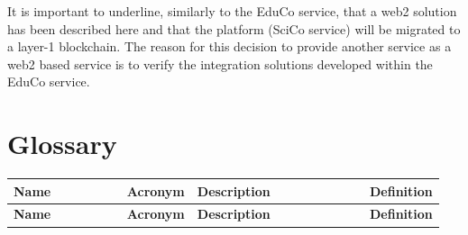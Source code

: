 \documentclass[]{article}
\begin{document}
It is important to underline, similarly to the EduCo service, that a web2 solution has been described here and that the platform (SciCo service) will be migrated to a layer-1 blockchain. 
The reason for this decision to provide another service as a web2 based service is to verify the integration solutions developed within the EduCo service.

\newpage
\printbibliography %
\newpage

\section*{Glossary}
\begin{longtable}{p{0.3\linewidth} p{0.1\linewidth} p{0.45\linewidth} p{0.1\linewidth}}
	\textbf{Name}&\textbf{Acronym}&\textbf{Description}&\textbf{Definition}\newline \\ \hline
	\endfirsthead
	\textbf{Name}&\textbf{Acronym}&\textbf{Description}&\textbf{Definition}\newline \\ \hline
	\endhead


\end{longtable}
\end{document}
